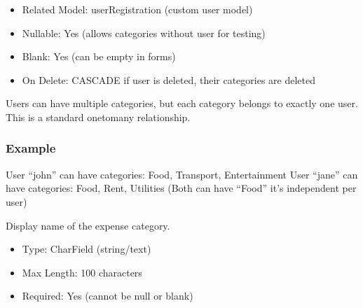 \documentclass[letterpaper,10pt,english]{sphinxmanual}
\begin{document}
\begin{fulllineitems}
\begin{fulllineitems}
\begin{description}
\begin{itemize}
\item {} 
\sphinxAtStartPar
Related Model: userRegistration (custom user model)

\item {} 
\sphinxAtStartPar
Nullable: Yes (allows categories without user for testing)

\item {} 
\sphinxAtStartPar
Blank: Yes (can be empty in forms)

\item {} 
\sphinxAtStartPar
On Delete: CASCADE \sphinxhyphen{} if user is deleted, their categories are deleted

\end{itemize}

\sphinxAtStartPar
Users can have multiple categories, but each category belongs
to exactly one user. This is a standard one\sphinxhyphen{}to\sphinxhyphen{}many relationship.

\end{description}
\subsubsection*{Example}

\sphinxAtStartPar
User “john” can have categories: Food, Transport, Entertainment
User “jane” can have categories: Food, Rent, Utilities
(Both can have “Food” \sphinxhyphen{} it’s independent per user)

\end{fulllineitems}


\begin{fulllineitems}
\label{\detokenize{expensesApp:id11}}
\pysigstartsignatures
\pysigline
{}
\pysigstopsignatures
\sphinxAtStartPar
Display name of the expense category.
\begin{description}
\begin{itemize}
\item {} 
\sphinxAtStartPar
Type: CharField (string/text)

\item {} 
\sphinxAtStartPar
Max Length: 100 characters

\item {} 
\sphinxAtStartPar
Required: Yes (cannot be null or blank)


\end{itemize}
\end{description}
\end{fulllineitems}
\end{fulllineitems}
\end{document}
